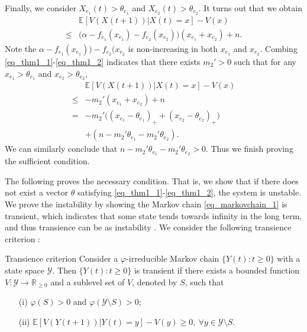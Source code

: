 Finally, we consider $X_{e_1}(t)>\theta_{e_1}$ and $X_{e_2}(t)>\theta_{e_2}$. It turns out that we obtain
\begin{align}
    &\mathbb{E}[V(X(t+1))|X(t)=x]-V(x) \nonumber \\
    \leq & \Big(\alpha - f_{e_1}(x_{e_1}) - f_{e_2}(x_{e_2})\Big)(x_{e_1}+x_{e_2}) + n. \nonumber
\end{align}
Note the $\alpha - f_{e_1}(x_{e_1})) - f_{e_2}(x_{e_2}$ is non-increasing in both $x_{e_1}$ and $x_{e_2}$. Combing \eqref{eq_thm1_1}-\eqref{eq_thm1_2} indicates that there exists $m_2'>0$ such that for any $x_{e_1}>\theta_{e_1}$ and $x_{e_2}>\theta_{e_2}$,
\begin{align*}
    &\mathbb{E}[V(X(t+1))|X(t)=x]-V(x) \\
    \leq& -m_2'(x_{e_1}+x_{e_2}) + n \\
    =& -m_2'\Big((x_{e_1}-\theta_{e_1})_++(x_{e_2}-\theta_{e_2})_+\Big) \\
    & + (n-m_2'\theta_{e_1}-m_2'\theta_{e_2}).
\end{align*}
We can similarly conclude that $n-m_2'\theta_{e_1}-m_2'\theta_{e_2}>0$. Thus we finish proving the sufficient condition.

The following proves the necessary condition. That is, we show that if there does not exist a vector $\theta$ satisfying \eqref{eq_thm1_1}-\eqref{eq_thm1_2}, the system is unstable. We prove the instability by showing the Markov chain \eqref{eq_markovchain_1} is transient, which indicates that some state tends towards infinity in the long term, and thus transience can be as instability \cite{meyn1993survey}. We consider the following transience criterion \cite{meyn2012markov}:
\begin{namedthm*}{Transience criterion}
Consider a $\varphi$-irreducible Markov chain $\{Y(t): t\ge0\}$ with a state space $\mathcal Y$. Then $\{Y(t): t\geq0\}$ is transient if there exists a bounded function $V:\mathcal{Y}\to\mathbb{R}_{\geq0}$ and a sublevel set of $V$, denoted by $S$, such that 
\begin{enumerate}
    \item[(i)] $\varphi(S)>0$ and $ \varphi(\mathcal{Y}\setminus S)>0$;
    \item[(ii)] $\mathbb{E}[V(Y(t+1))|Y(t)=y]-V(y)\geq0,~\forall y\in \mathcal{Y}\setminus S$.
\end{enumerate}
\end{namedthm*}

